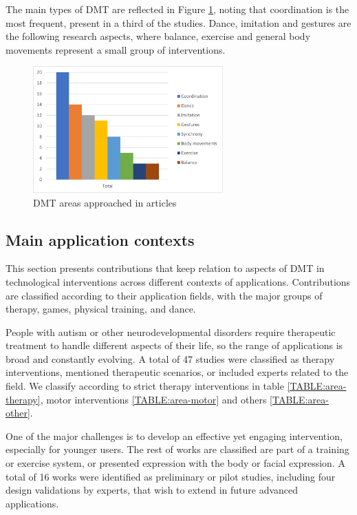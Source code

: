 \documentclass[a4paper,fleqn]{cas-sc}
\begin{document}
The main types of DMT are reflected in Figure \ref{fig:DMT-types}, noting that coordination is the most frequent, present in a third of the studies. Dance, imitation and gestures are the following research aspects, where balance, exercise and general body movements represent a small group of interventions.

\begin{figure}
	\includegraphics[width=0.65\textwidth]{fig5_DMT-types.png}
        \centering
	  \caption{DMT areas approached in articles}
        \label{fig:DMT-types}
\end{figure}

\subsection{Main application contexts}
\label{sec:app-contexts}
This section presents contributions that keep relation to aspects of DMT in technological interventions across different contexts of applications. Contributions are classified according to their application fields, with the major groups of therapy, games, physical training, and dance.

People with autism or other neurodevelopmental disorders require therapeutic treatment to handle different aspects of their life, so the range of applications is broad and constantly evolving. A total of 47 studies were classified as therapy interventions, mentioned therapeutic scenarios, or included experts related to the field. We classify according to strict therapy interventions in table \ref{TABLE:area-therapy}, motor interventions \ref{TABLE:area-motor} and others \ref{TABLE:area-other}.

One of the major challenges is to develop an effective yet engaging intervention, especially for younger users. The rest of works are classified are part of a training or exercise system, or presented expression with the body or facial expression. A total of 16 works were identified as preliminary or pilot studies, including four design validations by experts, that wish to extend in future advanced applications.
\end{document}
